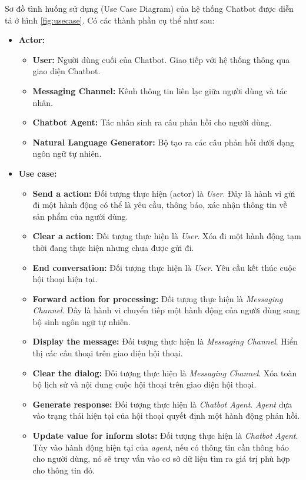 Sơ đồ tình huống sử dụng (Use Case Diagram) của hệ thống Chatbot được diễn tả ở hình \ref{fig:usecase}. Có các thành phần cụ thể như sau:

\begin{itemize}
    \item \textbf{Actor:}
    \begin{itemize}
        \item \textbf{User:} Người dùng cuối của Chatbot. Giao tiếp với hệ thống thông qua giao diện Chatbot.
        \item \textbf{Messaging Channel:} Kênh thông tin liên lạc giữa người dùng và tác nhân.
        \item \textbf{Chatbot Agent:} Tác nhân sinh ra câu phản hồi cho người dùng.
        \item \textbf{Natural Language Generator:} Bộ tạo ra các câu phản hồi dưới dạng ngôn ngữ tự nhiên.
    \end{itemize}
    \item \textbf{Use case:}
    \begin{itemize}
        \item \textbf{Send a action:} Đối tượng thực hiện (actor) là \textit{User}. Đây là hành vi gửi đi một hành động có thể là yêu cầu, thông báo, xác nhận thông tin về sản phẩm của người dùng.
        \item \textbf{Clear a action:} Đối tượng thực hiện là \textit{User}. Xóa đi một hành động tạm thời đang thực hiện nhưng chưa được gửi đi.
        \item \textbf{End conversation:} Đối tượng thực hiện là \textit{User}. Yêu cầu kết thúc cuộc hội thoại hiện tại.
        \item \textbf{Forward action for processing:} Đối tượng thực hiện là \textit{Messaging Channel}. Đây là hành vi chuyển tiếp một hành động của người dùng sang bộ sinh ngôn ngữ tự nhiên.
        \item \textbf{Display the message:} Đối tượng thực hiện là \textit{Messaging Channel}. Hiển thị các câu thoại trên giao diện hội thoại.
        \item \textbf{Clear the dialog:} Đối tượng thực hiện là \textit{Messaging Channel}. Xóa toàn bộ lịch sử và nội dung cuộc hội thoại trên giao diện hội thoại.
        \item \textbf{Generate response:} Đối tượng thực hiện là \textit{Chatbot Agent}. \textit{Agent} dựa vào trạng thái hiện tại của hội thoại quyết định một hành động phản hồi.
        \item \textbf{Update value for inform slots:} Đối tượng thực hiện là \textit{Chatbot Agent}. Tùy vào hành động hiện tại của \textit{agent}, nếu có thông tin cần thông báo cho người dùng, nó sẽ truy vấn vào cơ sở dữ liệu tìm ra giá trị phù hợp cho thông tin đó.

\end{itemize}
\end{itemize}
